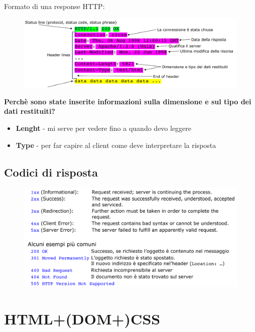 \documentclass[12pt, a4paper]{article}
\begin{document}
    \newpage
    Formato di una response HTTP:
    \begin{figure}[htbp]
        \centering
        \includegraphics[scale=0.4]{httpresponse.png}
    \end{figure}

    \textbf{Perchè sono state inserite informazioni sulla dimensione e sul tipo dei dati restituiti?}

    \begin{itemize}
        \item \textbf{Lenght} - mi serve per vedere fino a quando devo leggere
        \item \textbf{Type} - per far capire al client come deve interpretare la risposta
    \end{itemize}

    \subsection{Codici di risposta}
    \begin{figure}[htbp]
        \centering
        \includegraphics[scale=0.4]{codici.png}
    \end{figure}    








    \newpage
    \section{HTML+(DOM+)CSS}
\end{document}
